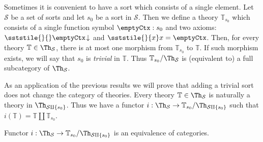 Sometimes it is convenient to have a sort which consists of a single element.
Let $\mathcal{S}$ be a set of sorts and let $s_0$ be a sort in $\mathcal{S}$.
Then we define a theory $\mathbb{T}_{s_0}$ which consists of a single function symbol $\emptyCtx : s_0$
    and two axioms: $\sststile{}{} \emptyCtx\!\downarrow$ and $\sststile{}{x} x = \emptyCtx$.
Then, for every theory $\mathbb{T} \in \Th_\mathcal{S}$, there is at most one morphism from $\mathbb{T}_{s_0}$ to $\mathbb{T}$.
If such morphism exists, we will say that $s_0$ is \emph{trivial} in $\mathbb{T}$.
Thus $\mathbb{T}_{s_0}/\Th_\mathcal{S}$ is (equivalent to) a full subcategory of $\Th_\mathcal{S}$.

As an application of the previous results we will prove that adding a trivial sort does not change the category of theories.
Every theory $\mathbb{T} \in \Th_\mathcal{S}$ is naturally a theory in $\Th_{\mathcal{S} \amalg \{ s_0 \}}$.
Thus we have a functor $i : \Th_\mathcal{S} \to \mathbb{T}_{s_0}/\Th_{\mathcal{S} \amalg \{ s_0 \}}$ such that $i(\mathbb{T}) = \mathbb{T} \amalg \mathbb{T}_{s_0}$.
\begin{prop}
Functor $i : \Th_\mathcal{S} \to \mathbb{T}_{s_0}/\Th_{\mathcal{S} \amalg \{ s_0 \}}$ is an equivalence of categories.
\end{prop}
